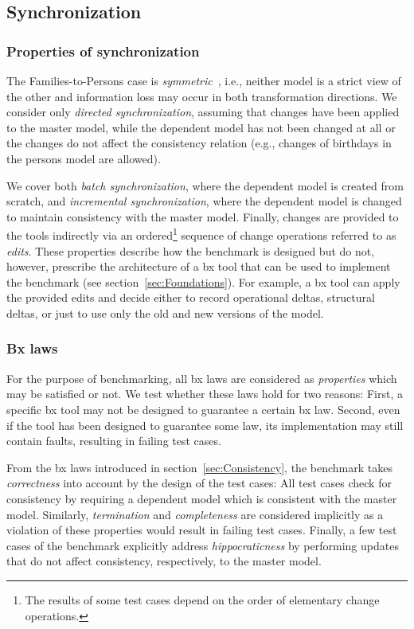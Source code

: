 \subsection{Synchronization}
\label{sec:ConsistencyRestoration}

\subsubsection{Properties of synchronization}

The Families-to-Persons case is \emph{symmetric}~\cite{DBLP:journals/jss/DiskinGWC16}, i.e., neither model is a strict view of the other and information loss may occur in both transformation directions. We consider only \emph{directed synchronization}, assuming that changes have been applied to the master model, while the dependent model has not been changed at all or the changes do not affect the consistency relation (e.g., changes of birthdays in the persons model are allowed). 

We cover both \emph{batch synchronization}, where the dependent model is created from scratch, and \emph{incremental synchronization}, where the dependent model is changed to maintain consistency with the master model. 
Finally, changes are provided to the tools indirectly via an ordered\footnote{The results of some test cases depend on the order of elementary change operations.} sequence of change operations referred to as \emph{edits}.
%
These properties describe how the benchmark is designed but do not, however, prescribe the architecture of a bx tool that can be used to implement the benchmark (see section~\ref{sec:Foundations}).
For example, a bx tool can apply the provided edits and decide either to record operational deltas, structural deltas, or just to use only the old and new versions of the model.

\subsubsection{Bx laws}
\label{sec:BxLaws}

For the purpose of benchmarking, all bx laws are considered as \emph{properties} which may be satisfied or not. 
We test whether these laws hold for two reasons: First, a specific bx tool may not be designed to guarantee a certain bx law. 
Second, even if the tool has been designed to guarantee some law, its implementation may still contain faults, resulting in failing test cases.

From the bx  laws introduced in section~\ref{sec:Consistency}, the benchmark takes \emph{correctness} into account by the design of the test cases: All test cases check for consistency by requiring a dependent model which is consistent with the master model. Similarly, \emph{termination} and \emph{completeness} are considered implicitly as a violation of these properties would result in failing test cases. Finally, a few test cases of the benchmark explicitly address \emph{hippocraticness} by performing updates that do not affect consistency, respectively, to the master model. 

